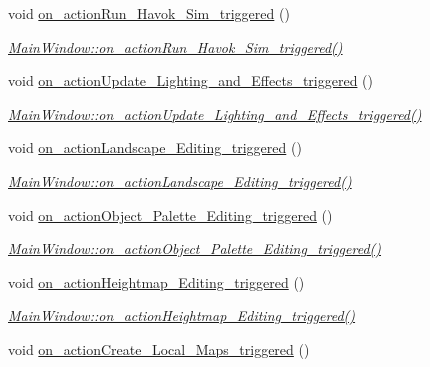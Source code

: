 \begin{DoxyCompactItemize}
void \hyperlink{class_main_window_ac9c08be5071382e5c549eaa3d5d9ccaf}{on\+\_\+action\+Run\+\_\+\+Havok\+\_\+\+Sim\+\_\+triggered} ()
\begin{DoxyCompactList}\small\item\em \hyperlink{class_main_window_ac9c08be5071382e5c549eaa3d5d9ccaf}{Main\+Window\+::on\+\_\+action\+Run\+\_\+\+Havok\+\_\+\+Sim\+\_\+triggered()} \end{DoxyCompactList}\item 
void \hyperlink{class_main_window_a8d9c1bfde135eb7efac2eeeefa0178c0}{on\+\_\+action\+Update\+\_\+\+Lighting\+\_\+and\+\_\+\+Effects\+\_\+triggered} ()
\begin{DoxyCompactList}\small\item\em \hyperlink{class_main_window_a8d9c1bfde135eb7efac2eeeefa0178c0}{Main\+Window\+::on\+\_\+action\+Update\+\_\+\+Lighting\+\_\+and\+\_\+\+Effects\+\_\+triggered()} \end{DoxyCompactList}\item 
void \hyperlink{class_main_window_a80757bcc5466819ce28ceb0e7840a2eb}{on\+\_\+action\+Landscape\+\_\+\+Editing\+\_\+triggered} ()
\begin{DoxyCompactList}\small\item\em \hyperlink{class_main_window_a80757bcc5466819ce28ceb0e7840a2eb}{Main\+Window\+::on\+\_\+action\+Landscape\+\_\+\+Editing\+\_\+triggered()} \end{DoxyCompactList}\item 
void \hyperlink{class_main_window_a730870f9625a5a193dcb54d0e757301a}{on\+\_\+action\+Object\+\_\+\+Palette\+\_\+\+Editing\+\_\+triggered} ()
\begin{DoxyCompactList}\small\item\em \hyperlink{class_main_window_a730870f9625a5a193dcb54d0e757301a}{Main\+Window\+::on\+\_\+action\+Object\+\_\+\+Palette\+\_\+\+Editing\+\_\+triggered()} \end{DoxyCompactList}\item 
void \hyperlink{class_main_window_a5a0e9a546c0ccf99df38eabe7a51bcf9}{on\+\_\+action\+Heightmap\+\_\+\+Editing\+\_\+triggered} ()
\begin{DoxyCompactList}\small\item\em \hyperlink{class_main_window_a5a0e9a546c0ccf99df38eabe7a51bcf9}{Main\+Window\+::on\+\_\+action\+Heightmap\+\_\+\+Editing\+\_\+triggered()} \end{DoxyCompactList}\item 
void \hyperlink{class_main_window_a8ef4f1be069a5526d6d5f1aced12b5c3}{on\+\_\+action\+Create\+\_\+\+Local\+\_\+\+Maps\+\_\+triggered} ()

\end{DoxyCompactItemize}
